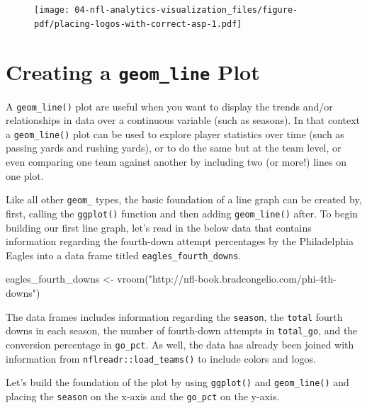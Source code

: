 \documentclass[
  letterpaper,
]{krantz}
\newenvironment{Shaded}{\begin{snugshade}}{\end{snugshade}}
\newcommand{\FunctionTok}[1]{\textcolor[rgb]{0.28,0.35,0.67}{#1}}
\newcommand{\NormalTok}[1]{\textcolor[rgb]{0.00,0.23,0.31}{#1}}
\newcommand{\OtherTok}[1]{\textcolor[rgb]{0.00,0.23,0.31}{#1}}
\newcommand{\StringTok}[1]{\textcolor[rgb]{0.13,0.47,0.30}{#1}}
\begin{document}
\begin{figure}[H]

{\centering \texttt{[image: 04-nfl-analytics-visualization\_files/figure-pdf/placing-logos-with-correct-asp-1.pdf]}

}

\end{figure}

\hypertarget{creating-a-geom_line-plot}{%
\section{\texorpdfstring{Creating a \texttt{geom\_line}
Plot}{Creating a geom\_line Plot}}\label{creating-a-geom_line-plot}}

A \texttt{geom\_line()} plot are useful when you want to display the
trends and/or relationships in data over a continuous variable (such as
seasons). In that context a \texttt{geom\_line()} plot can be used to
explore player statistics over time (such as passing yards and rushing
yards), or to do the same but at the team level, or even comparing one
team against another by including two (or more!) lines on one plot.

Like all other \texttt{geom\_} types, the basic foundation of a line
graph can be created by, first, calling the \texttt{ggplot()} function
and then adding \texttt{geom\_line()} after. To begin building our first
line graph, let's read in the below data that contains information
regarding the fourth-down attempt percentages by the Philadelphia Eagles
into a data frame titled \texttt{eagles\_fourth\_downs}.

\begin{Shaded}
\begin{Highlighting}[]
\NormalTok{eagles\_fourth\_downs }\OtherTok{\textless{}{-}} \FunctionTok{vroom}\NormalTok{(}\StringTok{"http://nfl{-}book.bradcongelio.com/phi{-}4th{-}downs"}\NormalTok{)}
\end{Highlighting}
\end{Shaded}

The data frames includes information regarding the \texttt{season}, the
\texttt{total} fourth downs in each season, the number of fourth-down
attempts in \texttt{total\_go}, and the conversion percentage in
\texttt{go\_pct}. As well, the data has already been joined with
information from \texttt{nflreadr::load\_teams()} to include colors and
logos.

Let's build the foundation of the plot by using \texttt{ggplot()} and
\texttt{geom\_line()} and placing the \texttt{season} on the x-axis and
the \texttt{go\_pct} on the y-axis.
\end{document}
